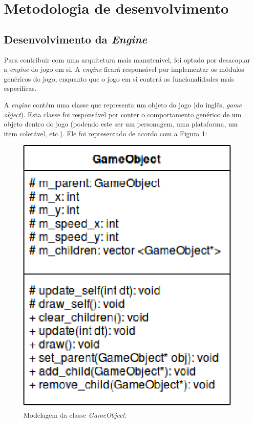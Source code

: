 \section{Metodologia de desenvolvimento} \label{devmet}

  \subsection{Desenvolvimento da \textit{Engine}}

    Para contribuir com uma arquitetura mais manutenível, foi optado por desacoplar a \textit{engine} do jogo em si. A \textit{engine} ficará responsável por implementar os módulos genéricos do jogo, enquanto que o jogo em si conterá as funcionalidades mais específicas.

    A \textit{engine} contém uma classe que representa um objeto do jogo (do inglês, \textit{game object}). Esta classe foi responsável por conter o comportamento genérico de um objeto dentro do jogo (podendo este ser um personagem, uma plataforma, um item coletável, etc.). Ele foi representado de acordo com a Figura \ref{game-object}:

    \vspace{\onelineskip}

    \begin{figure}[H]
      \centering \includegraphics[keepaspectratio=true,scale=0.6]{figuras/game-object.eps}
      \caption[Modelagem da classe \textit{GameObject}]
        {Modelagem da classe \textit{GameObject}.}
      \label{game-object}
    \end{figure}

